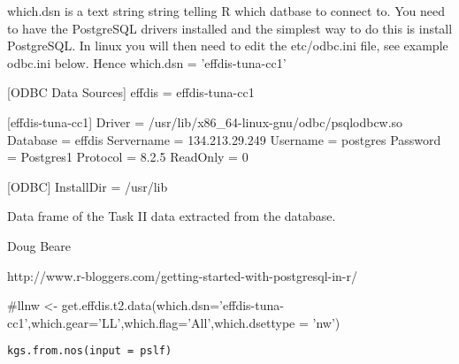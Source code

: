 \documentclass[letterpaper]{book}
\begin{document}
%
\begin{Details}\relax
which.dsn is a text string string telling R which datbase to connect to. You need to have the PostgreSQL drivers installed and the simplest way to do this is install PostgreSQL. In linux you will then need to edit the 
etc/odbc.ini file, see example odbc.ini below. Hence which.dsn = 'effdis-tuna-cc1'

[ODBC Data Sources]
effdis = effdis-tuna-cc1

[effdis-tuna-cc1]
Driver = /usr/lib/x86\_64-linux-gnu/odbc/psqlodbcw.so
Database = effdis
Servername = 134.213.29.249
Username = postgres
Password = Postgres1
Protocol = 8.2.5
ReadOnly = 0

[ODBC]
InstallDir = /usr/lib

\end{Details}
%
\begin{Value}
Data frame of the Task II data extracted from the database.
\end{Value}
%
\begin{Author}\relax
Doug Beare
\end{Author}
%
\begin{References}\relax
http://www.r-bloggers.com/getting-started-with-postgresql-in-r/
\end{References}
%
\begin{Examples}
\begin{ExampleCode}
#llnw <- get.effdis.t2.data(which.dsn='effdis-tuna-cc1',which.gear='LL',which.flag='All',which.dsettype = 'nw')
\end{ExampleCode}
\end{Examples}
%
\begin{Usage}
\begin{verbatim}
kgs.from.nos(input = pslf)
\end{verbatim}
\end{Usage}
%
\begin{Arguments}
\begin{ldescription}
\item[\code{input}] 


\end{ldescription}
\end{Arguments}
%
\end{document}
